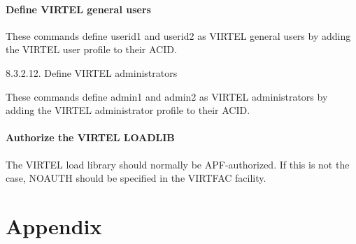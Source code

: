 \documentclass[letterpaper,10pt,english]{sphinxmanual}
\begin{document}
\subsubsection{Define VIRTEL general users}
\label{\detokenize{Installation_Guide:define-virtel-general-users}}
\begin{sphinxVerbatim}[commandchars=\\\{\}]
  
  
\end{sphinxVerbatim}


These commands define userid1 and userid2 as VIRTEL general users by adding the VIRTEL user profile to their ACID.

8.3.2.12. Define VIRTEL administrators

\begin{sphinxVerbatim}[commandchars=\\\{\}]
  
  
\end{sphinxVerbatim}


These commands define admin1 and admin2 as VIRTEL administrators by adding the VIRTEL administrator profile to their ACID.


\subsubsection{Authorize the VIRTEL LOADLIB}
\label{\detokenize{Installation_Guide:authorize-the-virtel-loadlib}}\label{\detokenize{Installation_Guide:index-185}}
The VIRTEL load library should normally be APF-authorized. If this is not the case, NOAUTH should be specified in the VIRTFAC facility.


\chapter{Appendix}
\label{\detokenize{Installation_Guide:appendix}}
\end{document}
